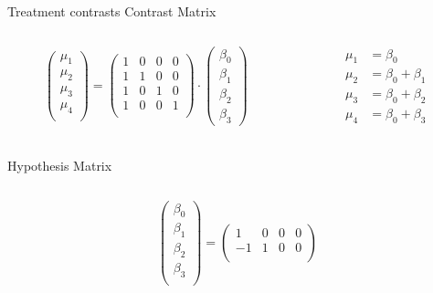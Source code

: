 \documentclass[aspectratio=169]{beamer}
\begin{document}
\begin{frame}{Treatment contrasts}
  \footnotesize
  Contrast Matrix
  \begin{columns}
    \begin{column}[t]{.5\textwidth}
\[
  \begin{pmatrix}
    \mu_1 \\
    \mu_2 \\
    \mu_3 \\
    \mu_4 \\
  \end{pmatrix} = 
  \begin{pmatrix}
    1 & 0 & 0 & 0 \\ 
    1 & 1 & 0 & 0 \\ 
    1 & 0 & 1 & 0 \\ 
    1 & 0 & 0 & 1 \\ 
  \end{pmatrix} \cdot
  \begin{pmatrix}
    \beta_0 \\
    \beta_1 \\
    \beta_2 \\
    \beta_3
  \end{pmatrix}
\]
    \end{column}
    \begin{column}[t]{.5\textwidth}
\begin{align*}
  \mu_1 & = \beta_0 \\
  \mu_2 & = \beta_0 + \beta_1 \\
  \mu_3 & = \beta_0 + \beta_2 \\
  \mu_4 & = \beta_0 + \beta_3 \\
\end{align*}
    \end{column}
  \end{columns}
  \vspace{-.8cm}
  Hypothesis Matrix
  \begin{columns}
    \begin{column}[t]{.5\textwidth}
\[
  \begin{pmatrix}
    \beta_0 \\
    \beta_1 \\
    \beta_2 \\
    \beta_3 \\
  \end{pmatrix} = 
  \begin{pmatrix}
   1 & 0 & 0 & 0 \\ 
  -1 & 1 & 0 & 0 \\ 

\end{pmatrix}\]
\end{column}
\end{columns}
\end{frame}
\end{document}
